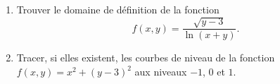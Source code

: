 \begin{exercice}\label{exocontrolecontinu0002}
  \begin{enumerate}
  \item Trouver le domaine de définition de la fonction 
    \begin{equation}
      f(x,y)=\frac{\sqrt{y-3}}{\ln (x+y)}.
    \end{equation}
  \item Tracer, si elles existent, les courbes de niveau de la fonction $\displaystyle f(x,y)= x^2+ (y-3)^2$ aux niveaux $-1$, $0$ et $1$.  
  \end{enumerate} 
\end{exercice}
